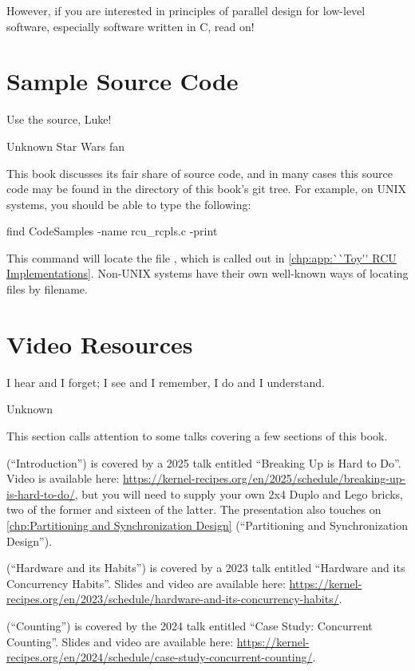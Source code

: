 However, if you are interested in principles of parallel design
for low-level software, especially software written in C, read on!

\section{Sample Source Code}
\label{sec:howto:Sample Source Code}
%
\epigraph{Use the source, Luke!}{Unknown Star Wars fan}

This book discusses its fair share of source code, and in many cases
this source code may be found in the  directory
of this book's git tree.
For example, on UNIX systems, you should be able to type the following:

\begin{VerbatimU}
find CodeSamples -name rcu_rcpls.c -print
\end{VerbatimU}

This command will locate the file , which is called out in
\cref{chp:app:``Toy'' RCU Implementations}\@.
Non-UNIX systems have their own well-known ways of locating files by filename.

\section{Video Resources}
\label{sec:howto:Video Resources}
%
\epigraph{I hear and I forget; I see and I remember, I do and I understand.}
	 {Unknown}

This section calls attention to some talks covering a few sections of
this book.

 (``Introduction'') is covered by a 2025 talk
entitled ``Breaking Up is Hard to Do''.
Video is available here:
\url{https://kernel-recipes.org/en/2025/schedule/breaking-up-is-hard-to-do/},
but you will need to supply your own 2x4 Duplo and Lego bricks, two of the
former and sixteen of the latter.
The presentation also touches on
\cref{chp:Partitioning and Synchronization Design}
(``Partitioning and Synchronization Design'').

 (``Hardware and its Habits'') is
covered by a 2023 talk entitled ``Hardware and its Concurrency Habits''.
Slides and video are available here:
\url{https://kernel-recipes.org/en/2023/schedule/hardware-and-its-concurrency-habits/}.

 (``Counting'') is covered by the 2024 talk entitled
``Case Study:
Concurrent Counting''.
Slides and video are available here:
\url{https://kernel-recipes.org/en/2024/schedule/case-study-concurrent-counting/}.

